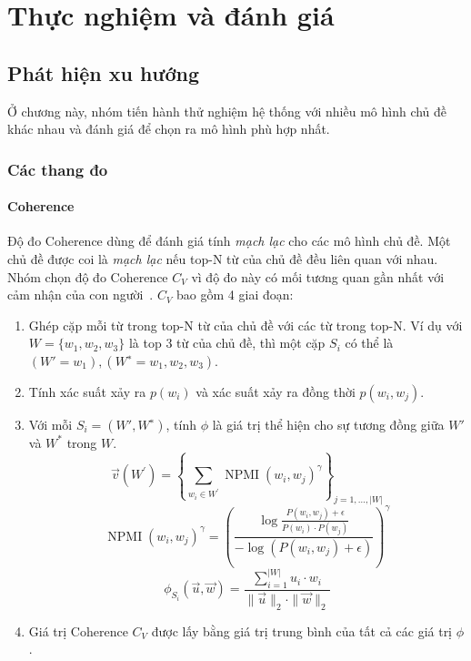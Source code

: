 \chapter{Thực nghiệm và đánh giá}
\label{chap:experiments}


\section{Phát hiện xu hướng}
Ở chương này, nhóm tiến hành thử nghiệm hệ thống với nhiều mô hình chủ đề khác nhau và đánh giá để chọn ra mô hình phù hợp nhất.

\subsection{Các thang đo}

\subsubsection{Coherence}
Độ đo Coherence dùng để đánh giá tính \textit{mạch lạc} cho các mô hình chủ đề. Một chủ đề được coi là \textit{mạch lạc} nếu top-N từ của chủ đề đều liên quan với nhau. Nhóm chọn độ đo Coherence $C_V$ vì độ đo này có mối tương quan gần nhất với cảm nhận của con người~\cite{syedFullTextAbstractExamining2017}. $C_V$ bao gồm 4 giai đoạn:
\begin{enumerate}
    \item Ghép cặp mỗi từ trong top-N từ của chủ đề với các từ trong top-N. Ví dụ với $W = \{w_1, w_2, w_3\}$ là top 3 từ của chủ đề, thì một cặp $S_i$ có thể là $(W'= w_1),(W^∗ = w_1, w_2, w_3)$.
    \item Tính xác suất xảy ra $p(w_i)$ và xác suất xảy ra đồng thời $p(w_i, w_j)$.
    \item Với mỗi $S_i = (W', W^∗)$, tính $\phi$ là giá trị thể hiện cho sự tương đồng giữa $W'$ và $W^*$ trong $W$.
    $$
    \vec{v}\left(W^{\prime}\right)=\left\{\sum_{w_{i} \in W^{\prime}} \operatorname{NPMI}\left(w_{i}, w_{j}\right)^{\gamma}\right\}_{j=1, \ldots,|W|}
    $$
    $$
    \operatorname{NPMI}\left(w_{i}, w_{j}\right)^{\gamma}=\left(\frac{\log \frac{P\left(w_{i}, w_{j}\right)+\epsilon}{P\left(w_{i}\right) \cdot P\left(w_{j}\right)}}{-\log \left(P\left(w_{i}, w_{j}\right)+\epsilon\right)}\right)^{\gamma}
    $$
    $$
    \phi_{S_{i}}(\vec{u}, \vec{w})=\frac{\sum_{i=1}^{|W|} u_{i} \cdot w_{i}}{\|\vec{u}\|_{2} \cdot\|\vec{w}\|_{2}}
    $$
    \item Giá trị Coherence $C_V$ được lấy bằng giá trị trung bình của tất cả các giá trị $\phi$.
\end{enumerate}

